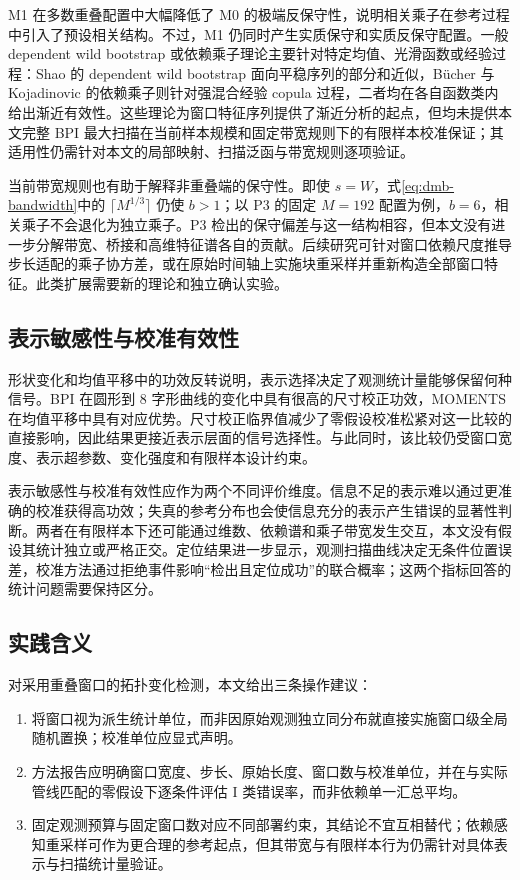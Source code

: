M1 在多数重叠配置中大幅降低了 M0 的极端反保守性，说明相关乘子在参考过程中引入了预设相关结构。不过，M1 仍同时产生实质保守和实质反保守配置。一般 dependent wild bootstrap 或依赖乘子理论主要针对特定均值、光滑函数或经验过程\cite{Shao2010,BucherKojadinovic2016}：Shao 的 dependent wild bootstrap 面向平稳序列的部分和近似，B{\"u}cher 与 Kojadinovic 的依赖乘子则针对强混合经验 copula 过程，二者均在各自函数类内给出渐近有效性。这些理论为窗口特征序列提供了渐近分析的起点，但均未提供本文完整 BPI 最大扫描在当前样本规模和固定带宽规则下的有限样本校准保证；其适用性仍需针对本文的局部映射、扫描泛函与带宽规则逐项验证。

当前带宽规则也有助于解释非重叠端的保守性。即使 $s=W$，式\eqref{eq:dmb-bandwidth}中的 $\lceil M^{1/3}\rceil$ 仍使 $b>1$；以 P3 的固定 $M=192$ 配置为例，$b=6$，相关乘子不会退化为独立乘子。P3 检出的保守偏差与这一结构相容，但本文没有进一步分解带宽、桥接和高维特征谱各自的贡献。后续研究可针对窗口依赖尺度推导步长适配的乘子协方差，或在原始时间轴上实施块重采样并重新构造全部窗口特征。此类扩展需要新的理论和独立确认实验。

\subsection{表示敏感性与校准有效性}\label{sec:disc-representation}

形状变化和均值平移中的功效反转说明，表示选择决定了观测统计量能够保留何种信号。BPI 在圆形到 8 字形曲线的变化中具有很高的尺寸校正功效，MOMENTS 在均值平移中具有对应优势。尺寸校正临界值减少了零假设校准松紧对这一比较的直接影响，因此结果更接近表示层面的信号选择性。与此同时，该比较仍受窗口宽度、表示超参数、变化强度和有限样本设计约束。

表示敏感性与校准有效性应作为两个不同评价维度。信息不足的表示难以通过更准确的校准获得高功效；失真的参考分布也会使信息充分的表示产生错误的显著性判断。两者在有限样本下还可能通过维数、依赖谱和乘子带宽发生交互，本文没有假设其统计独立或严格正交。定位结果进一步显示，观测扫描曲线决定无条件位置误差，校准方法通过拒绝事件影响“检出且定位成功”的联合概率；这两个指标回答的统计问题需要保持区分。

\subsection{实践含义}\label{sec:disc-practice}

对采用重叠窗口的拓扑变化检测，本文给出三条操作建议：\begin{enumerate}\item 将窗口视为派生统计单位，而非因原始观测独立同分布就直接实施窗口级全局随机置换；校准单位应显式声明。\item 方法报告应明确窗口宽度、步长、原始长度、窗口数与校准单位，并在与实际管线匹配的零假设下逐条件评估 I 类错误率，而非依赖单一汇总平均。\item 固定观测预算与固定窗口数对应不同部署约束，其结论不宜互相替代；依赖感知重采样可作为更合理的参考起点，但其带宽与有限样本行为仍需针对具体表示与扫描统计量验证。\end{enumerate}

